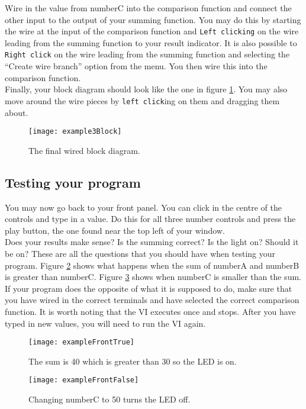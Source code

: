 	Wire in the value from numberC into the comparison function and connect the other input to the output of your summing function. You may do this by starting the wire at the input of the comparison function and \texttt{Left clicking} on the wire leading from the summing function to your result indicator. It is also possible to \texttt{Right click} on the wire leading from the summing function and selecting the ``Create wire branch'' option from the menu. You then wire this into the comparison function.\\
	
	Finally, your block diagram should look like the one in figure \ref{example3Block}. You may also move around the wire pieces by \texttt{left click}ing on them and dragging them about.\\
	\begin{figure}
		\centering
		\texttt{[image: example3Block]}
		\caption{The final wired block diagram.}
		\label{example3Block}
	\end{figure}

	\subsection{Testing your program}
	You may now go back to your front panel. You can click in the centre of the controls and type in a value. Do this for all three number controls and press the play button, the one found near the top left of your window.\\
	
	Does your results make sense? Is the summing correct? Is the light on? Should it be on? These are all the questions that you should have when testing your program. Figure \ref{exampleFrontTrue} shows what happens when the sum of numberA and numberB is greater than numberC. Figure \ref{exampleFrontFalse} shows when numberC is smaller than the sum. If your program does the opposite of what it is supposed to do, make sure that you have wired in the correct terminals and have selected the correct comparison function. It is worth noting that the VI executes once and stops. After you have typed in new values, you will need to run the VI again.\\
	\begin{figure}
		\centering
		\texttt{[image: exampleFrontTrue]}
		\caption{The sum is 40 which is greater than 30 so the LED is on.}
		\label{exampleFrontTrue}
	\end{figure}
	\begin{figure}
		\centering
		\texttt{[image: exampleFrontFalse]}
		\caption{Changing numberC to 50 turns the LED off.}
		\label{exampleFrontFalse}
	\end{figure}

